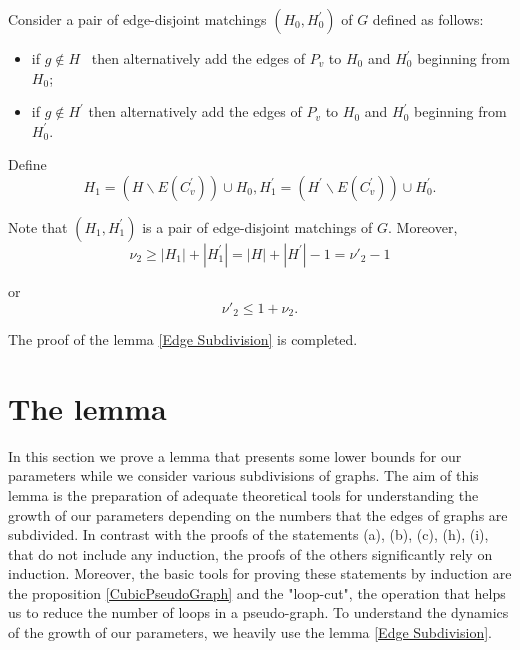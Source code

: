 \documentclass[fleqn,12pt,twoside]{article}
\newenvironment{proof}[1][Proof.]{\begin{trivlist}
\item[\hskip \labelsep {\bfseries #1}]}{\end{trivlist}}
\begin{document}
\begin{proof}
Consider a pair of edge-disjoint matchings $(H_{0},H_{0}^{\prime })$
of $G$ defined as follows:

\begin{itemize}
\item if $g\notin H$ \ then alternatively add the edges of $P_{v}$ to $H_{0}$
and $H_{0}^{\prime }$ beginning from $H_{0}$;

\item if $g\notin H^{\prime }$ then alternatively add the edges of $P_{v}$
to $H_{0}$ and $H_{0}^{\prime }$ beginning from $H_{0}^{\prime }$.
\end{itemize}

Define\begin{equation*}
H_{1}=(H\backslash E(C_{v}^{\prime }))\cup H_{0},H_{1}^{\prime
}=(H^{\prime }\backslash E(C_{v}^{\prime }))\cup H_{0}^{\prime }.
\end{equation*}

Note that $(H_{1},H_{1}^{\prime })$ is a pair of edge-disjoint matchings of $G$. Moreover,\begin{equation*}
\nu _{2}\geq \left\vert H_{1}\right\vert +\left\vert H_{1}^{\prime
}\right\vert =\left\vert H\right\vert +\left\vert H^{\prime
}\right\vert -1=\nu' _{2}-1
\end{equation*}

or\begin{equation*}
\nu' _{2}\leq 1+\nu _{2}.
\end{equation*}

The proof of the lemma \ref{Edge Subdivision} is completed.
\end{proof}

\section{The lemma}

In this section we prove a lemma that presents some lower bounds for
our parameters while we consider various subdivisions of graphs. The
aim of this lemma is the preparation of adequate theoretical tools
for understanding the growth of our parameters depending on the
numbers that the edges of graphs are subdivided. In contrast with
the proofs of the statements (a), (b), (c), (h), (i), that do not
include any induction, the proofs of the others significantly rely
on induction. Moreover, the basic tools for proving these statements
by induction are the proposition \ref{CubicPseudoGraph} and the
"loop-cut", the operation that helps us to reduce the number of
loops in a pseudo-graph. To understand the dynamics of the growth of
our parameters, we heavily use the lemma \ref{Edge Subdivision}.
\end{document}
